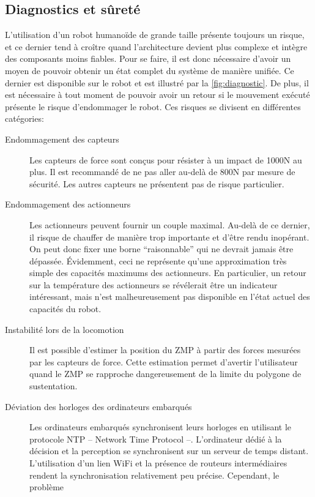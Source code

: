 \subsection{Diagnostics et sûreté}

L'utilisation d'un robot humanoïde de grande taille présente toujours
un risque, et ce dernier tend à croître quand l'architecture devient
plus complexe et intègre des composants moins fiables. Pour se faire,
il est donc nécessaire d'avoir un moyen de pouvoir obtenir un état
complet du système de manière unifiée. Ce dernier est disponible sur
le robot et est illustré par la \autoref{fig:diagnostic}. De plus, il
est nécessaire à tout moment de pouvoir avoir un retour si le
mouvement exécuté présente le risque d'endommager le robot. Ces
risques se divisent en différentes catégories:
\begin{description}
\item[Endommagement des capteurs] Les capteurs de force sont conçus
  pour résister à un impact de 1000N au plus. Il est recommandé de ne
  pas aller au-delà de 800N par mesure de sécurité. Les autres
  capteurs ne présentent pas de risque particulier.
\item[Endommagement des actionneurs] Les actionneurs peuvent fournir
  un couple maximal. Au-delà de ce dernier, il risque de chauffer de
  manière trop importante et d'être rendu inopérant. On peut donc
  fixer une borne ``raisonnable'' qui ne devrait jamais être
  dépassée. Évidemment, ceci ne représente qu'une approximation très
  simple des capacités maximums des actionneurs. En particulier, un
  retour sur la température des actionneurs se révélerait être un
  indicateur intéressant, mais n'est malheureusement pas disponible en
  l'état actuel des capacités du robot.
\item[Instabilité lors de la locomotion] Il est possible d'estimer la
  position du ZMP à partir des forces
  mesurées par les capteurs de force. Cette estimation permet
  d'avertir l'utilisateur quand le ZMP se rapproche dangereusement de
  la limite du polygone de sustentation.
\item[Déviation des horloges des ordinateurs embarqués] Les
  ordinateurs embarqués synchronisent leurs horloges en utilisant le
  protocole NTP -- Network Time Protocol --. L'ordinateur dédié à la décision et la perception
  se synchronisent sur un serveur de temps distant. L'utilisation d'un
  lien WiFi et la présence de routeurs intermédiaires rendent la
  synchronisation relativement peu précise. Cependant, le problème

\end{description}
